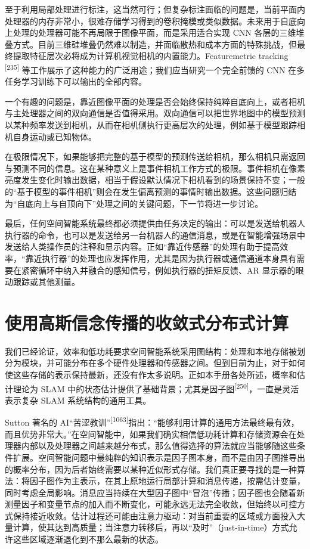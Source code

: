 至于利用局部处理进行标注，这当然可行；但复杂标注面临的问题是，当前平面内处理器的内存非常小，很难存储学习得到的卷积掩模或类似数据。未来用于自底向上处理的处理器可能不再局限于图像平面，而是采用适合实现 CNN 各层的三维堆叠方式。目前三维硅堆叠仍然难以制造，并面临散热和成本方面的特殊挑战，但最终提取特征层次必将成为计算机视觉相机的内置能力。Featuremetric tracking \textsuperscript{[235]} 等工作展示了这种能力的广泛用途；我们应当研究一个完全前馈的 CNN 在多任务学习训练下可以输出的全部内容。

一个有趣的问题是，靠近图像平面的处理是否会始终保持纯粹自底向上，或者相机与主处理器之间的双向通信是否值得采用。双向通信可以把世界地图中的模型预测以某种频率发送到相机，从而在相机侧执行更高层次的处理，例如基于模型跟踪相机自身运动或已知物体。

在极限情况下，如果能够把完整的基于模型的预测传送给相机，那么相机只需返回与预测不同的信息。这在某种意义上是事件相机工作方式的极限。事件相机在像素亮度发生变化时输出数据，相当于假设默认情况下相机看到的场景保持不变；一般的“基于模型的事件相机”则会在发生偏离预测的事情时输出数据。这些问题归结为“自底向上与自顶向下”处理之间的关键问题，下一节将进一步讨论。

最后，任何空间智能系统最终都必须提供由任务决定的输出：可以是发送给机器人执行器的命令，也可以是发送给另一台机器人的通信消息，或是在智能增强场景中发送给人类操作员的注释和显示内容。正如“靠近传感器”的处理有助于提高效率，“靠近执行器”的处理也应发挥作用，尤其是因为执行器或通信通道本身具有需要在紧密循环中纳入并融合的感知信号，例如执行器的扭矩反馈、AR 显示器的眼动跟踪或其他测量。

\section{使用高斯信念传播的收敛式分布式计算}

我们已经论证，效率和低功耗要求空间智能系统采用图结构：处理和本地存储被划分为模块，并可能分布在多个硬件处理器和传感器之间。但到目前为止，对于如何使这些存储的表示保持最新，还没有作太多说明。正如本手册各处所述，概率和估计理论为 SLAM 中的状态估计提供了基础背景；尤其是因子图\textsuperscript{[250]}，一直是灵活表示复杂 SLAM 系统结构的通用工具。

Sutton 著名的 AI“苦涩教训”\textsuperscript{[1063]}指出：“能够利用计算的通用方法最终最有效，而且优势非常大。”在空间智能中，如果我们确实相信低功耗计算和存储资源会在处理器内部以及处理器之间越来越分布式，那么值得选择的算法就应当能够随这些条件扩展。空间智能问题中最纯粹的知识表示是因子图本身，而不是由因子图推导出的概率分布，因为后者始终需要以某种近似形式存储。我们真正要寻找的是一种算法：将因子图作为主表示，在其上原地运行局部计算和消息传递，按需估计变量，同时考虑全局影响。消息应当持续在大型因子图中“冒泡”传播；因子图也会随着新测量因子和变量节点的加入而不断变化，可能永远无法完全收敛，但始终以可控方式保持接近收敛。估计过程还可能由注意力驱动：对当前重要的区域或方面投入大量计算，使其达到高质量；当注意力转移后，再以“及时”（just-in-time）方式允许这些区域逐渐退化到不那么最新的状态。

